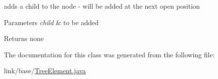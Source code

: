adds a child to the node -\/ will be added at the next open position


\begin{DoxyParams}{Parameters}
{\em child} & to be added\\
\hline
\end{DoxyParams}
\begin{DoxyReturn}{Returns}
none 
\end{DoxyReturn}


The documentation for this class was generated from the following file\+:\begin{DoxyCompactItemize}
\item 
link/base/\hyperlink{_tree_element_8java}{Tree\+Element.\+java}\end{DoxyCompactItemize}
